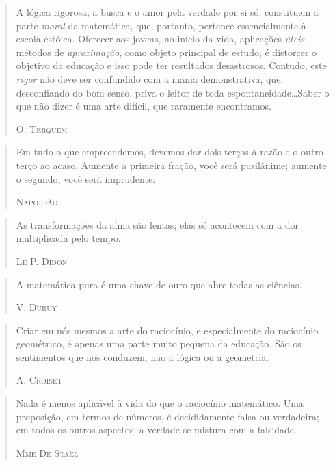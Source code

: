 \documentclass{hipatia}
\begin{document}
 
\begin{quote}
A lógica rigorosa, a busca e o amor pela verdade por si só, constituem a parte \emph{moral} da matemática, que, portanto, pertence essencialmente à escola estóica. Oferecer aos jovens, no início da vida, aplicações \emph{úteis}, métodos de \emph{aproximação}, como objeto principal de estudo, é distorcer o objetivo da educação e isso pode ter resultados desastrosos. Contudo, este \emph{rigor} não deve ser confundido com a mania demonstrativa, que, desconfiando do bom senso, priva o leitor de toda espontaneidade\dots  Saber o que não dizer é uma arte difícil, que raramente encontramos.

\hfill \textsc{O. Terquem}
\end{quote}

 
\begin{quote}
Em tudo o que empreendemos, devemos dar dois terços à razão e o outro terço ao acaso. Aumente a primeira fração, você será pusilânime; aumente o segundo, você será imprudente.

\hfill \textsc{Napoleão}
\end{quote}
 

 
\begin{quote}
As transformações da alma são lentas; elas só acontecem com a dor multiplicada pelo tempo.

\hfill \textsc{Le P. Didon}
\end{quote}

\begin{quote}
A matemática pura é uma chave de ouro que abre todas as ciências.

\hfill \textsc{V. Duruy}
\end{quote}


\begin{quote}
Criar em nós mesmos a arte do raciocínio, e especialmente do raciocínio geométrico, é apenas uma parte muito pequena da educação. São os sentimentos que nos conduzem, não a lógica ou a geometria.

\hfill \textsc{A. Croiset}
\end{quote}

 
\begin{quote}
Nada é menos aplicável à vida do que o raciocínio matemático. Uma proposição, em termos de números, é decididamente falsa ou verdadeira; em todos os outros aspectos, a verdade se mistura com a falsidade\dots 

\hfill \textsc{Mme De Staël}
\end{quote}
\end{document}
